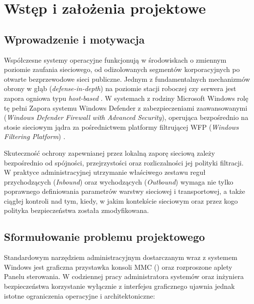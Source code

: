\chapter{Wstęp i założenia projektowe}\label{ch:wstep}

\section{Wprowadzenie i motywacja}\label{sec:wprowadzenie}

Współczesne systemy operacyjne funkcjonują w środowiskach o zmiennym poziomie zaufania sieciowego, od odizolowanych segmentów korporacyjnych po otwarte bezprzewodowe sieci publiczne. Jednym z fundamentalnych mechanizmów obrony w głąb (\textit{defense-in-depth}) na poziomie stacji roboczej czy serwera jest zapora ogniowa typu \textit{host-based} \cite{nist-sp800-41}. W systemach z rodziny Microsoft Windows rolę tę pełni Zapora systemu Windows Defender z zabezpieczeniami zaawansowanymi (\textit{Windows Defender Firewall with Advanced Security}), operująca bezpośrednio na stosie sieciowym jądra za pośrednictwem platformy filtrującej WFP (\textit{Windows Filtering Platform}) \cite{ms-defender-firewall, ms-wfp}.

Skuteczność ochrony zapewnianej przez lokalną zaporę sieciową zależy bezpośrednio od spójności, przejrzystości oraz rozliczalności jej polityki filtracji. W praktyce administracyjnej utrzymanie właściwego zestawu reguł przychodzących (\textit{Inbound}) oraz wychodzących (\textit{Outbound}) wymaga nie tylko poprawnego definiowania parametrów warstwy sieciowej i transportowej, a także ciągłej kontroli nad tym, kiedy, w jakim kontekście sieciowym oraz przez kogo polityka bezpieczeństwa została zmodyfikowana.

\section{Sformułowanie problemu projektowego}\label{sec:problem-projektowy}

Standardowym narzędziem administracyjnym dostarczanym wraz z systemem Windows jest graficzna przystawka konsoli MMC () oraz rozproszone aplety Panelu sterowania. W codziennej pracy administratora systemów oraz inżyniera bezpieczeństwa korzystanie wyłącznie z interfejsu graficznego ujawnia jednak istotne ograniczenia operacyjne i architektoniczne:

